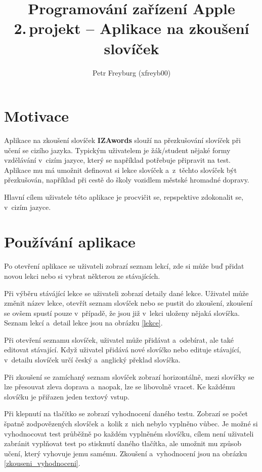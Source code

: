 \documentclass[10pt, a4paper]{article}
\title{Programování zařízení Apple\\ {\large 2.\,projekt -- Aplikace na zkoušení slovíček} }
\author{Petr Freyburg (xfreyb00)}
\date{}
\begin{document}
\maketitle

\section{Motivace}

Aplikace na zkoušení slovíček \textbf{IZAwords} slouží na přezkušování slovíček při učení se cizího jazyka. Typickým uživatelem je žák/student nějaké formy vzdělávání v~cizím jazyce, který se například potřebuje připravit na test. Aplikace mu má umožnit definovat si lekce slovíček a~z~těchto slovíček být přezkušován, například při cestě do školy vozidlem městské hromadné dopravy.

Hlavní cílem uživatele této aplikace je procvičit se, repspektive zdokonalit se, v~cizím jazyce.

\section{Používání aplikace}

Po otevření aplikace se uživateli zobrazí seznam lekcí, zde si může buď přidat novou lekci nebo si vybrat některou ze stávajících.

Při výběru stávájící lekce se uživateli zobrazí detaily dané lekce. Uživatel může změnit název lekce, otevřít seznam slovíček nebo se pustit do zkoušení, zkoušení se ovšem spustí pouze v~případě, že jsou již v~lekci uloženy nějaká slovíčka. Seznam lekcí a~detail lekce jsou na obrázku \ref{lekce}.

Při otevření seznamu slovíček, uživatel může přidávat a~odebírat, ale také editovat stávající. Když uživatel přidává nové slovíčko nebo edituje stávající, v~detailu slovíček určí český a~anglický překlad slovíčka.

Při zkoušení se zamíchaný seznam slovíček zobrazí horizontálně, mezi slovíčky se lze přesouvat zleva doprava a~naopak, lze se libovolně vracet. Ke každému slovíčku je přiřazen jeden textový vstup.

Při klepnutí na tlačítko  se zobrazí vyhodnocení daného testu. Zobrazí se počet špatně zodpovězených slovíček a~kolik z~nich nebylo vyplněno vůbec. Je možné si vyhodnocovat test průběžně po každém vyplněném slovíčku, cílem není uživateli zabránit vyplňovat test po stisknutí daného tlačítka, ale umožnit mu způsob učení, který vyhovuje jemu samému. Zkoušení a~vyhodnocení jsou na obrázku \ref{zkouseni_vyhodnoceni}.
\end{document}
